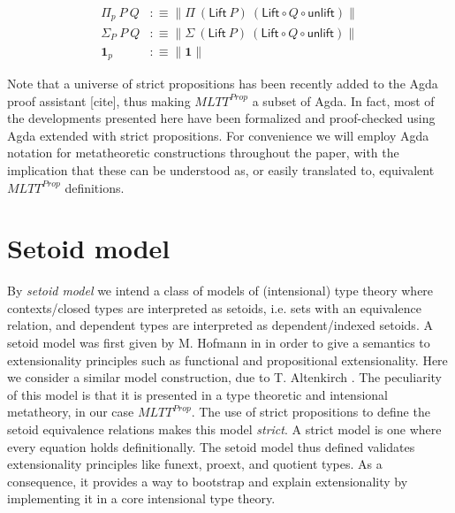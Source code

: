 \documentclass{easychair}
\begin{document}
\begin{align*}
  \Pi_p\ P\ Q & :\equiv \| \Pi\ (\textsf{Lift} \ P)\ (\textsf{Lift} \circ Q \circ \textsf{unlift}) \| \\
  \Sigma_P\ P\ Q & :\equiv \| \Sigma\ (\textsf{Lift} \ P)\ (\textsf{Lift} \circ Q \circ \textsf{unlift}) \| \\
  \mathbf{1}_p & :\equiv \| \mathbf{1} \|
\end{align*}

Note that a universe of strict propositions has been recently added to the Agda
proof assistant [cite], thus making $MLTT^{Prop}$ a subset of Agda. In fact,
most of the developments presented here have been formalized and proof-checked
using Agda extended with strict propositions. For convenience we will employ
Agda notation for metatheoretic constructions throughout the paper, with the
implication that these can be understood as, or easily translated to, equivalent
$MLTT^{Prop}$ definitions.

\section{Setoid model}


By \emph{setoid model} we intend a class of models of (intensional) type theory
where contexts/closed types are interpreted as setoids, i.e. sets with an
equivalence relation, and dependent types are interpreted as dependent/indexed
setoids.
%
A setoid model was first given by M. Hofmann in \cite{hofmann-ext-int} in order
to give a semantics to extensionality principles such as functional and
propositional extensionality. Here we consider a similar model construction, due
to T. Altenkirch \cite{setoid-model}.
%
The peculiarity of this model is that it is presented in a type theoretic and
intensional metatheory, in our case $MLTT^{Prop}$.
%
The use of strict propositions to define the setoid equivalence relations makes
this model \emph{strict}. A strict model is one where every equation holds
definitionally. The setoid model thus defined validates extensionality
principles like funext, proext, and quotient types. As a consequence, it
provides a way to bootstrap and explain extensionality by implementing it in a
core intensional type theory.
\end{document}
